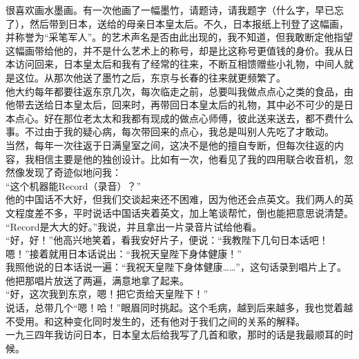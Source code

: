 很喜欢画水墨画。有一次他画了一幅墨竹，请题诗，请我题字（什么字，早已忘了），然后带到日本，送给的母亲日本皇太后。不久，日本报纸上刊登了这幅画，并称誉为“采笔军人”。的艺术声名是否由此出现的，我不知道，但我敢断定他指望这幅画带给他的，并不是什么艺术上的称号，却是比这称号更值钱的身价。我从日本访问回来，日本皇太后和我有了经常的往来，不断互相馈赠些小礼物，中间人就是这位。从那次他送了墨竹之后，东京与长春的往来就更频繁了。\\

他大约每年都要往返东京几次，每次临走之前，总要叫我做点点心之类的食品，由他带去送给日本皇太后，回来时，再带回日本皇太后的礼物，其中必不可少的是日本点心。好在那位老太太和我都有现成的做点心师傅，彼此送来送去，都不费什么事。不过由于我的疑心病，每次带回来的点心，我总是叫别人先吃了才敢动。\\

当然，每年一次往返于日满皇室之间，这决不是他的擅自专断，但每次往返的内容，我相信主要是他的独创设计。比如有一次，他看见了我的四用联合收音机，忽然像发现了奇迹似地问我：\\

“这个机器能Record（录音）？”\\

他的中国话不大好，但我们交谈起来还不困难，因为他还会点英文。我们两人的英文程度差不多，平时说话中国话夹着英文，加上笔谈帮忙，倒也能把意思说清楚。\\

“Record是大大的好。”我说，并且拿出一片录音片试给他看。\\

“好，好！”他高兴地笑着，看我安好片子，便说：“我教陛下几句日本话吧！嗯！”接着就用日本话说出：“我祝天皇陛下身体健康！”\\

我照他说的日本话说一遍：“我祝天皇陛下身体健康……”，这句话录到唱片上了。他把那唱片放送了两遍，满意地拿了起来。\\

“好，这次我到东京，嗯！把它贡给天皇陛下！”\\

说话，总带几个“嗯！哈！”眼眉同时挑起。这个毛病，越到后来越多，我也觉着越不受用。和这种变化同时发生的，还有他对于我们之间的关系的解释。\\

一九三四年我访问日本，日本皇太后给我写了几首和歌，那时的话是我最顺耳的时候。\\

